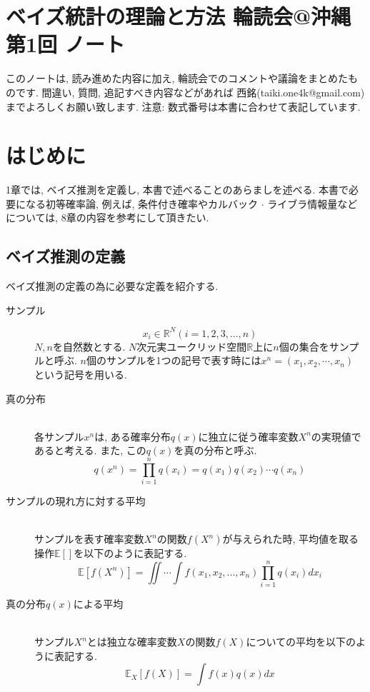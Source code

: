 \documentclass[11pt,a4paper]{jsarticle}
\begin{document}
%
%
\section*{ベイズ統計の理論と方法 輪読会@沖縄 第1回 ノート}
このノートは, 読み進めた内容に加え, 輪読会でのコメントや議論をまとめたものです. 間違い, 質問, 追記すべき内容などがあれば 西銘(\textrm{taiki.one4k@gmail.com}) までよろしくお願い致します. 注意: 数式番号は本書に合わせて表記しています.

\section{はじめに}
1章では, ベイズ推測を定義し, 本書で述べることのあらましを述べる. 本書で必要になる初等確率論, 例えば, 条件付き確率やカルバック $\cdot$ ライブラ情報量などについては, 8章の内容を参考にして頂きたい. 

\subsection{ベイズ推測の定義}

ベイズ推測の定義の為に必要な定義を紹介する.
\begin{description}
\item[サンプル]\mbox{}
\[x_i \in \mathbb{R}^N (i = 1,2,3, ... ,n) \tag{1.1} \]
$N, n$を自然数とする. $N$次元実ユークリッド空間$\mathbb{R}$上に$n$個の集合をサンプルと呼ぶ. $n$個のサンプルを1つの記号で表す時には$x^n = (x_1, x_2, \cdots , x_n)$ という記号を用いる.

\item[真の分布]\mbox{}\\
各サンプル$x^n$は, ある確率分布$q(x)$に独立に従う確率変数$X^n$の実現値であると考える. また, この$q(x)$を真の分布と呼ぶ.
\[q(x^n) = \prod_{i=1}^{n}q(x_i) = q(x_1)q(x_2)\cdots q(x_n) \tag{1.4} \]

\item[サンプルの現れ方に対する平均]\mbox{}\\
サンプルを表す確率変数$X^n$の関数$f(X^n)$が与えられた時, 平均値を取る操作$\mathbb{E[　]}$を以下のように表記する.
\[\mathbb{E}[f(X^n)] = \iint \cdots \int f(x_1, x_2, ... , x_n) \prod_{i=1}^{n}q(x_i) dx_i \]

\item[真の分布$q(x)$による平均]\mbox{}\\
サンプル$X^n$とは独立な確率変数$X$の関数$f(X)$についての平均を以下のように表記する.
\[\mathbb{E}_{X}[f(X)] = \int f(x)q(x) dx\]
\end{description}
\end{document}
